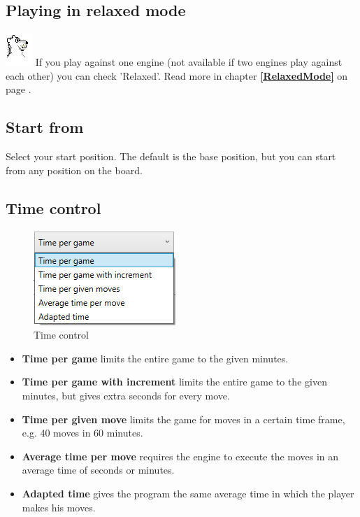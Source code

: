 \documentclass[11pt,a4paper]{article}
\begin{document}
\subsection{Playing in relaxed mode}

\includegraphics[scale=0.8]{BearChessIcon.png} If you play against one engine (not available if two engines play against each other) you can check 'Relaxed'.  Read more in chapter \textbf{\ref{RelaxedMode}  } on page \pageref{RelaxedMode}.


\subsection{Start from}
Select your start position. The default is the base position, but you can start from any position on the board.


\subsection{Time control}

\begin{figure}[H]
	\centering
	\includegraphics[scale=1.0]{TimeControl.png}
	\caption{Time control}
	\label{fig:TimeControl}
\end{figure}

\begin{itemize}
	\item \textbf{Time per game} limits the entire game to the given minutes.
	\item \textbf{Time per game with increment} limits the entire game to the given minutes, but gives extra seconds for every move.
	\item \textbf{Time per given move} limits the game for moves in a certain time frame, e.g. 40 moves in 60 minutes.
	\item \textbf{Average time per move} requires the engine to execute the moves in an average time of seconds or minutes.
	\item \textbf{Adapted time} gives the program the same average time in which the player makes his moves.	
\end{itemize}
\end{document}
